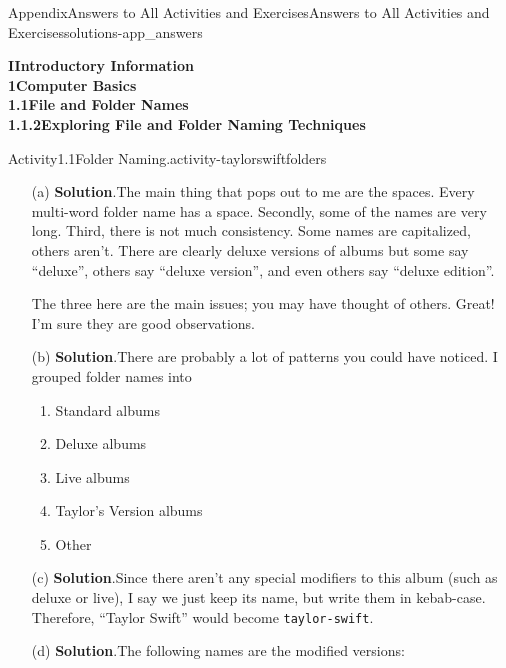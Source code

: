 \documentclass[twoside,10pt,]{book}
\newcommand{\blocktitlefont}{\relax}
\newcommand{\mono}[1]{\texttt{#1}}
\begin{document}
\begin{solutions-chapter}{Appendix}{Answers to All Activities and Exercises}{}{Answers to All Activities and Exercises}{}{}{solutions-app_answers}
\par\medskip
\noindent\textbf{\Large{}I\space\textperiodcentered\space{}Introductory Information\\
1\space\textperiodcentered\space{}Computer Basics\\
1.1\space\textperiodcentered\space{}File and Folder Names\\
1.1.2\space\textperiodcentered\space{}Exploring File and Folder Naming Techniques}
\begin{activitysolution}{Activity}{1.1}{Folder Naming.}{activity-taylorswiftfolders}%
\begin{enumerate}[font=\bfseries,label=(\alph*),ref=\alph*]%
\item[(a)]\noindent\textbf{\blocktitlefont Solution}.\hypertarget{solution-taylorswiftfolders-d-b-back}{}\quad{}The main thing that pops out to me are the spaces. Every multi-word folder name has a space. Secondly, some of the names are very long. Third, there is not much consistency. Some names are capitalized, others aren't. There are clearly deluxe versions of albums but some say ``deluxe'', others say ``deluxe version'', and even others say ``deluxe edition''.%
\par
The three here are the main issues; you may have thought of others. Great! I'm sure they are good observations.%
\item[(b)]\noindent\textbf{\blocktitlefont Solution}.\hypertarget{solution-taylorswiftgroups-b-back}{}\quad{}There are probably a lot of patterns you could have noticed. I grouped folder names into%
\begin{enumerate}[label=\arabic*]
\item{}Standard albums%
\item{}Deluxe albums%
\item{}Live albums%
\item{}Taylor's Version albums%
\item{}Other%
\end{enumerate}
%
\item[(c)]\noindent\textbf{\blocktitlefont Solution}.\hypertarget{solution-taylorswiftfolders-f-b-back}{}\quad{}Since there aren't any special modifiers to this album (such as deluxe or live), I say we just keep its name, but write them in kebab-case. Therefore, ``Taylor Swift'' would become \mono{taylor-swift}.%
\item[(d)]\noindent\textbf{\blocktitlefont Solution}.\hypertarget{solution-taylorswiftfolders-g-b-back}{}\quad{}The following names are the modified versions:%

\end{enumerate}
\end{activitysolution}
\end{solutions-chapter}
\end{document}
